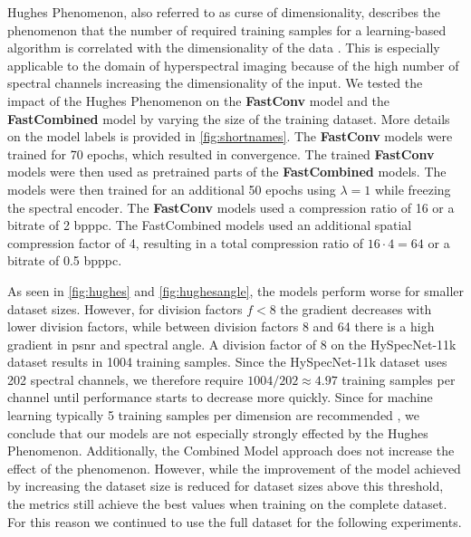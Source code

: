 Hughes Phenomenon, also referred to as curse of dimensionality, describes the phenomenon that the number of required training samples for a learning-based algorithm is correlated with the dimensionality of the data \citep{hughes_mean_1968}. This is especially applicable to the domain of hyperspectral imaging because of the high number of spectral channels increasing the dimensionality of the input. We tested the impact of the Hughes Phenomenon on the \textbf{FastConv} model and the \textbf{FastCombined} model by varying the size of the training dataset. More details on the model labels is provided in \autoref{fig:shortnames}. The \textbf{FastConv} models were trained for 70 epochs, which resulted in convergence.
The trained \textbf{FastConv} models were then used as pretrained parts of the \textbf{FastCombined} models. The models were then trained for an additional 50 epochs using $\lambda=1$ while freezing the spectral encoder. 
The \textbf{FastConv} models used a compression ratio of 16 or a bitrate of 2 \ac{bpppc}. The FastCombined models used an additional spatial compression factor of 4, resulting in a total compression ratio of $16 \cdot 4=64$ or a bitrate of 0.5 \ac{bpppc}.

As seen in \autoref{fig:hughes} and \autoref{fig:hughesangle}, the models perform worse for smaller dataset sizes. However, for division factors $f < 8$ the gradient decreases with lower division factors, while between division factors 8 and 64 there is a high gradient in \ac{psnr} and spectral angle. A division factor of 8 on the HySpecNet-11k dataset results in 1004 training samples. Since the HySpecNet-11k dataset uses 202 spectral channels, we therefore require $1004/202 \approx 4.97$ training samples per channel until performance starts to decrease more quickly. Since for machine learning typically 5 training samples per dimension are recommended \citep{theodoridis_pattern_2009}, we conclude that our models are not especially strongly effected by the Hughes Phenomenon. Additionally, the Combined Model approach does not increase the effect of the phenomenon. However, while the improvement of the model achieved by increasing the dataset size is reduced for dataset sizes above this threshold, the metrics still achieve the best values when training on the complete dataset. For this reason we continued to use the full dataset for the following experiments.
